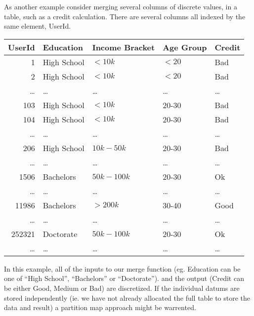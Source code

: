\documentclass{article}
\begin{document}
As another example consider merging several columns of discrete values,
in a table,
such as a credit calculation.
There are several columns all indexed by the same element, UserId.
\begin{center}
\begin{tabular}{|r|l|l|l|l|}
\hline
  UserId & Education   & Income Bracket & Age Group & Credit \\
\hline
  1      & High School & $<10k$       & $< 20$  & Bad    \\
  2      & High School & $<10k$       & $< 20$  & Bad    \\
  \ldots & \ldots      & \dots        & \ldots  & \ldots \\
  103    & High School & $<10k$       & 20-30   & Bad    \\
  104    & High School & $<10k$       & 20-30   & Bad    \\
  \ldots & \ldots      & \dots        & \ldots  & \ldots \\
  206    & High School & $10k-50k$    & 20-30   & Bad    \\
  \ldots & \ldots      & \dots        & \ldots  & \ldots \\
  1506   & Bachelors   & $50k-100k$   & 20-30   & Ok     \\
  \ldots & \ldots      & \dots        & \ldots  & \ldots \\
  11986  & Bachelors   & $>200k$      & 30-40   & Good \\
  \ldots & \ldots      & \dots        & \ldots  & \ldots \\
  252321 & Doctorate   & $50k-100k$   & 20-30   & Ok \\
  \ldots & \ldots      & \dots        & \ldots  & \ldots \\
  \hline
\end{tabular}
\end{center}
In this example, all of the inputs to our merge function
(eg. Education can be one of ``High School'', ``Bachelors''
or ``Doctorate'').
and the output (Credit can be either Good, Medium or Bad)
are discretized.
If the individual datums are stored independently (ie. we have not
already allocated the full table to store the data and result) a
partition map approach might be warrented.
\end{document}
